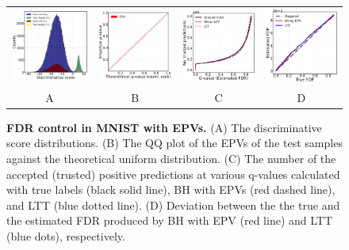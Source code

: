 \documentclass{article}
\begin{document}
\begin{figure}
	\centering
	\begin{tabular}{cccc}
		\includegraphics[width=1.78in]{img/cls_overview.png}&
		\includegraphics[width=1.73in]{img/cnn_QQ_classical.png} &
		\includegraphics[width=1.69in]{img/cnn_classical_fdr_control.png} &
		\includegraphics[width=1.68in]{img/cnn_FDPscat_classical.png} \\
		A & B & C & D \\
	\end{tabular}
	\caption{{\bf FDR control in MNIST with EPVs. } (A) The discriminative score distributions. (B) The QQ plot of the EPVs of the test samples against the theoretical uniform distribution. (C) The number of the accepted (trusted) positive predictions at various q-values calculated with true labels (black solid line), BH with EPVs (red dashed line), and LTT (blue dotted line). (D) Deviation between the the true and the estimated FDR produced by BH with EPV (red line) and LTT (blue dots), respectively.}
	\label{fig:binary}
\end{figure}
 
\end{document}
